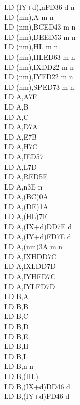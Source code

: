 \begin{multicols}{3}
{\begin{tabbing}
        LD (IY+d),n\>FD36 d n\\
        LD (nm),A m n\\
        LD (nm),BC\>ED43 m n\\
        LD (nm),DE\>ED53 m n\\
        LD (nm),HL m n\\
        LD (nm),HL\>ED63 m n\\
        LD (nm),IX\>DD22 m n\\
        LD (nm),IY\>FD22 m n\\
        LD (nm),SP\>ED73 m n\\
        LD A,A\>7F\\
        LD A,B\\
        LD A,C\\
        LD A,D\>7A\\
        LD A,E\>7B\\
        LD A,H\>7C\\
        LD A,I\>ED57\\
        LD A,L\>7D\\
        LD A,R\>ED5F\\
        LD A,n\>3E n\\
        LD A,(BC)\>0A\\
        LD A,(DE)\>1A\\
        LD A,(HL)\>7E\\
        LD A,(IX+d)\>DD7E d\\
        LD A,(IY+d)\>FD7E d\\
        LD A,(nm)\>3A m n\\
        LD A,IXH\UNDOC\>DD7C\\
        LD A,IXL\UNDOC\>DD7D\\
        LD A,IYH\UNDOC\>FD7C\\
        LD A,IYL\UNDOC\>FD7D\\
        LD B,A\\
        LD B,B\\
        LD B,C\\
        LD B,D\\
        LD B,E\\
        LD B,H\\
        LD B,L\\
        LD B,n n\\
        LD B,(HL)\\
        LD B,(IX+d)\>DD46 d\\
        LD B,(IY+d)\>FD46 d\\

\end{tabbing}}
\end{multicols}
